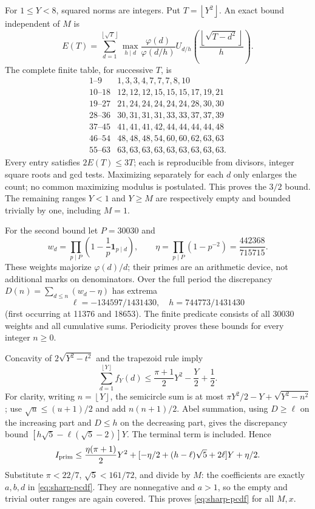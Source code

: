 \documentclass[11pt]{article}
\theoremstyle{definition}\newtheorem{definition}[theorem]{Definition}
\theoremstyle{remark}\newtheorem{remark}[theorem]{Remark}
\newcommand{\unit}{\mathbf1}
\newcommand{\floor}[1]{\left\lfloor #1\right\rfloor}
\begin{document}
For \(1\le Y<8\), squared norms are integers. Put \(T=\floor{Y^2}\).
An exact bound independent of \(M\) is
\[
 E(T)=\sum_{d=1}^{\floor{\sqrt T}}
 \max_{h\mid d}\frac{\varphi(d)}{\varphi(d/h)}
 U_{d/h}\left(\frac{\floor{\sqrt{T-d^2}}}{h}\right).
\]
The complete finite table, for successive \(T\), is
\[
\begin{array}{c|l}
1\text{--}9&1,3,3,4,7,7,7,8,10\\
10\text{--}18&12,12,12,15,15,15,17,19,21\\
19\text{--}27&21,24,24,24,24,24,28,30,30\\
28\text{--}36&30,31,31,31,33,33,37,37,39\\
37\text{--}45&41,41,41,42,44,44,44,44,48\\
46\text{--}54&48,48,48,54,60,60,62,63,63\\
55\text{--}63&63,63,63,63,63,63,63,63,63 .
\end{array}
\]
Every entry satisfies \(2E(T)\le3T\); each is reproducible from divisors,
integer square roots and gcd tests. Maximizing separately for each \(d\)
only enlarges the count; no common maximizing modulus is postulated.
This proves the \(3/2\) bound. The remaining ranges \(Y<1\) and \(Y\ge M\)
are respectively empty and bounded trivially by one, including \(M=1\).

For the second bound let \(P=30030\) and
\[
 w_d=\prod_{p\mid P}\left(1-\frac1p\unit_{p\mid d}\right),\qquad
 \eta=\prod_{p\mid P}(1-p^{-2})=\frac{442368}{715715}.
\]
These weights majorize \(\varphi(d)/d\); their primes are an arithmetic
device, not additional marks on denominators.
Over the full period the discrepancy
\(D(n)=\sum_{d\le n}(w_d-\eta)\) has extrema
\[
 \ell=-134597/1431430,\quad h=744773/1431430
\]
(first occurring at 11376 and 18653).
The finite predicate consists of all 30030 weights and all cumulative
sums. Periodicity proves these bounds for every integer \(n\ge0\).

Concavity of \(2\sqrt{Y^2-t^2}\) and the trapezoid rule imply
\[
 \sum_{d=1}^{\floor Y}f_Y(d)
 \le\frac{\pi+1}{2}Y^2-\frac Y2+\frac12 .
\]
For clarity, writing \(n=\floor Y\), the semicircle sum is at most
\(\pi Y^2/2-Y+\sqrt{Y^2-n^2}\); use
\(\sqrt u\le(u+1)/2\) and add \(n(n+1)/2\).
Abel summation, using \(D\ge\ell\) on the increasing part and \(D\le h\)
on the decreasing part, gives the discrepancy bound
\([h\sqrt5-\ell(\sqrt5-2)]Y\).
The terminal term is included. Hence
\[
 I_{\rm prim}\le
 \frac{\eta(\pi+1)}2Y^2+
 [-\eta/2+(h-\ell)\sqrt5+2\ell]Y+\eta/2 .
\]
Substitute \(\pi<22/7\), \(\sqrt5<161/72\), and divide by \(M\):
the coefficients are exactly \(a,b,d\) in \eqref{eq:sharp-pcdf}.
They are nonnegative and \(a>1\), so the empty and trivial outer
ranges are again covered. This proves \eqref{eq:sharp-pcdf} for all \(M,x\).
\end{document}
